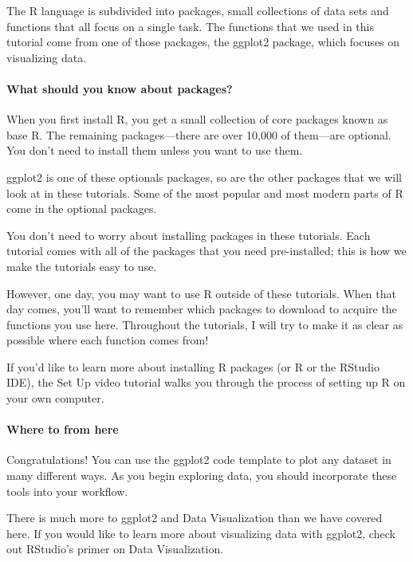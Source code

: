\documentclass[
]{article}
\begin{document}
The R language is subdivided into packages, small collections of data
sets and functions that all focus on a single task. The functions that
we used in this tutorial come from one of those packages, the ggplot2
package, which focuses on visualizing data.

\hypertarget{what-should-you-know-about-packages}{%
\paragraph{What should you know about
packages?}\label{what-should-you-know-about-packages}}

When you first install R, you get a small collection of core packages
known as base R. The remaining packages---there are over 10,000 of
them---are optional. You don't need to install them unless you want to
use them.

ggplot2 is one of these optionals packages, so are the other packages
that we will look at in these tutorials. Some of the most popular and
most modern parts of R come in the optional packages.

You don't need to worry about installing packages in these tutorials.
Each tutorial comes with all of the packages that you need
pre-installed; this is how we make the tutorials easy to use.

However, one day, you may want to use R outside of these tutorials. When
that day comes, you'll want to remember which packages to download to
acquire the functions you use here. Throughout the tutorials, I will try
to make it as clear as possible where each function comes from!

If you'd like to learn more about installing R packages (or R or the
RStudio IDE), the Set Up video tutorial walks you through the process of
setting up R on your own computer.

\hypertarget{where-to-from-here}{%
\paragraph{Where to from here}\label{where-to-from-here}}

Congratulations! You can use the ggplot2 code template to plot any
dataset in many different ways. As you begin exploring data, you should
incorporate these tools into your workflow.

There is much more to ggplot2 and Data Visualization than we have
covered here. If you would like to learn more about visualizing data
with ggplot2, check out RStudio's primer on Data Visualization.
\end{document}
